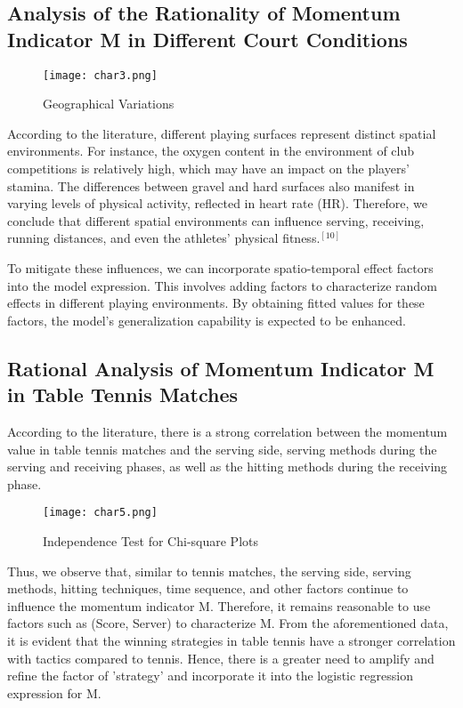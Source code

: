 \documentclass[12pt]{article}
\begin{document}
\subsection{Analysis of the Rationality of Momentum Indicator M in Different Court Conditions}

\begin{figure}[H]
	\centering
	\texttt{[image: char3.png]}
	\caption{Geographical Variations}\label{tb:char3}
\end{figure}

According to the literature, different playing surfaces represent distinct spatial environments. For instance, the oxygen content in the environment of club competitions is relatively high, which may have an impact on the players' stamina. The differences between gravel and hard surfaces also manifest in varying levels of physical activity, reflected in heart rate (HR). Therefore, we conclude that different spatial environments can influence serving, receiving, running distances, and even the athletes' physical fitness.$^{[10]} $

To mitigate these influences, we can incorporate spatio-temporal effect factors into the model expression. This involves adding factors to characterize random effects in different playing environments. By obtaining fitted values for these factors, the model's generalization capability is expected to be enhanced.

\subsection{Rational Analysis of Momentum Indicator M in Table Tennis Matches}

According to the literature, there is a strong correlation between the momentum value in table tennis matches and the serving side, serving methods during the serving and receiving phases, as well as the hitting methods during the receiving phase.

\begin{figure}[H]
	\centering
	\texttt{[image: char5.png]}
	\caption{Independence Test for Chi-square Plots}\label{tb:char5}
\end{figure}

Thus, we observe that, similar to tennis matches, the serving side, serving methods, hitting techniques, time sequence, and other factors continue to influence the momentum indicator M. Therefore, it remains reasonable to use factors such as (Score, Server) to characterize M. From the aforementioned data, it is evident that the winning strategies in table tennis have a stronger correlation with tactics compared to tennis. Hence, there is a greater need to amplify and refine the factor of 'strategy' and incorporate it into the logistic regression expression for M.
\end{document}
